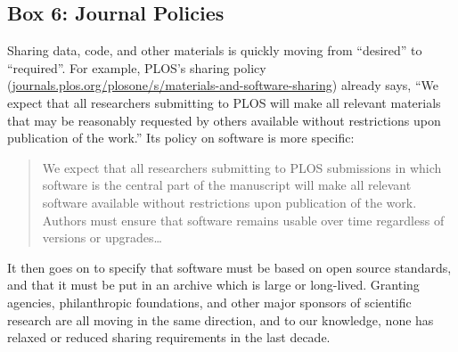 \subsection*{Box 6: Journal Policies}

Sharing data, code, and other materials is quickly moving from ``desired'' to ``required''.
For example, PLOS's sharing policy (\href{http://journals.plos.org/plosone/s/materials-and-software-sharing}{journals.plos.org/plosone/s/materials-and-software-sharing})
already says, ``We expect that all researchers submitting to PLOS will make all relevant materials that may be reasonably requested by others available without restrictions upon publication of the work.''
Its policy on software is more specific:

\begin{quote}
We expect that all researchers submitting to PLOS submissions in which software is the central part of the manuscript will make all relevant software available without restrictions upon publication of the work. Authors must ensure that software remains usable over time regardless of versions or upgrades\ldots
\end{quote}

It then goes on to specify that software must be based on open source standards,
and that it must be put in an archive which is large or long-lived.
Granting agencies, philanthropic foundations, and other major sponsors of scientific research are all moving in the same direction,
and to our knowledge,
none has relaxed or reduced sharing requirements in the last decade.
